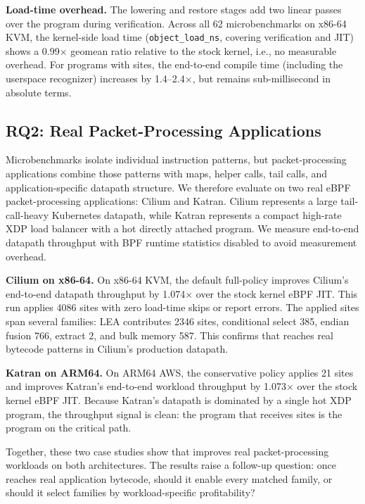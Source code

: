 \noindent\textbf{Load-time overhead.}
The \lang lowering and restore stages add two linear passes over the program during verification. Across all 62 microbenchmarks on x86-64 KVM, the kernel-side load time (\texttt{object\_load\_ns}, covering verification and JIT) shows a 0.99$\times$ geomean ratio relative to the stock kernel, i.e., no measurable overhead. For programs with \lang sites, the end-to-end compile time (including the userspace recognizer) increases by 1.4--2.4$\times$, but remains sub-millisecond in absolute terms.



\subsection{RQ2: Real Packet-Processing Applications}
\label{subsec:corpus_application}

Microbenchmarks isolate individual instruction patterns, but packet-processing applications combine those patterns with maps, helper calls, tail calls, and application-specific datapath structure. We therefore evaluate \lang on two real eBPF packet-processing applications: Cilium and Katran. Cilium represents a large tail-call-heavy Kubernetes datapath, while Katran represents a compact high-rate XDP load balancer with a hot directly attached program. We measure end-to-end datapath throughput with BPF runtime statistics disabled to avoid measurement overhead.

\textbf{Cilium on x86-64.}
On x86-64 KVM, the default full-\lang policy improves Cilium's end-to-end datapath throughput by 1.074$\times$ over the stock kernel eBPF JIT. This run applies 4086 \lang sites with zero load-time skips or report errors. The applied sites span several families: LEA contributes 2346 sites, conditional select 385, endian fusion 766, extract 2, and bulk memory 587. This confirms that \lang reaches real bytecode patterns in Cilium's production datapath.

\textbf{Katran on ARM64.}
On ARM64 AWS, the conservative \lang policy applies 21 sites and improves Katran's end-to-end workload throughput by 1.073$\times$ over the stock kernel eBPF JIT. Because Katran's datapath is dominated by a single hot XDP program, the throughput signal is clean: the program that receives \lang sites is the program on the critical path.

Together, these two case studies show that \lang improves real packet-processing workloads on both architectures. The results raise a follow-up question: once \lang reaches real application bytecode, should it enable every matched family, or should it select families by workload-specific profitability?


